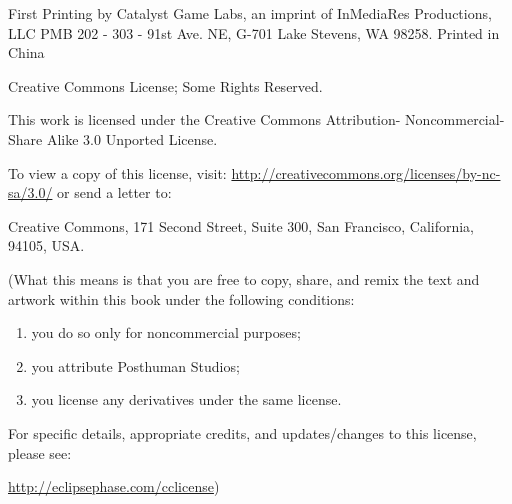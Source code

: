 First Printing by Catalyst Game Labs, an imprint of InMediaRes Productions, LLC
PMB 202 - 303 - 91st Ave. NE, G-701 Lake Stevens, WA 98258.  Printed in China

Creative Commons License; Some Rights Reserved.

This work is licensed under the Creative Commons Attribution-
Noncommercial-Share Alike 3.0 Unported License.

To view a copy of this license, visit:
\url{http://creativecommons.org/licenses/by-nc-sa/3.0/}{} or send a letter to:

\begin{center}
  Creative Commons, 171 Second Street, Suite 300, San Francisco, California,
  94105, USA.
\end{center}

(What this means is that you are free to copy, share, and remix the text and
artwork within this book under the following conditions:

\begin{enumerate}
\item you do so only for noncommercial purposes;
\item you attribute Posthuman Studios;
\item you license any derivatives under the same license. 
\end{enumerate}

For specific details, appropriate credits, and updates/changes to this license,
please see:

\begin{center}
  \url{http://eclipsephase.com/cclicense}{})
\end{center}


